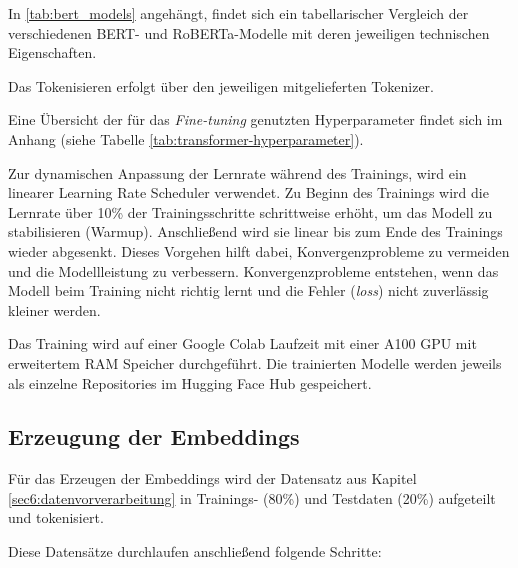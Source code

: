 In \ref{tab:bert_models} angehängt, findet sich ein tabellarischer Vergleich der verschiedenen BERT- und RoBERTa-Modelle mit deren jeweiligen technischen Eigenschaften.

Das Tokenisieren erfolgt über den jeweiligen mitgelieferten Tokenizer.

Eine Übersicht der für das \textit{Fine-tuning} genutzten Hyperparameter findet sich im Anhang (siehe Tabelle \ref{tab:transformer-hyperparameter}).

Zur dynamischen Anpassung der Lernrate während des Trainings, wird ein linearer Learning Rate Scheduler verwendet.
Zu Beginn des Trainings wird die Lernrate über 10\% der Trainingsschritte schrittweise erhöht, um das Modell zu stabilisieren (Warmup). 
Anschließend wird sie linear bis zum Ende des Trainings wieder abgesenkt. Dieses Vorgehen hilft dabei, Konvergenzprobleme zu vermeiden und die Modellleistung zu verbessern.
Konvergenzprobleme entstehen, wenn das Modell beim Training nicht richtig lernt und die Fehler (\textit{loss}) nicht zuverlässig kleiner werden.

Das Training wird auf einer Google Colab Laufzeit mit einer A100 GPU mit erweitertem RAM Speicher durchgeführt.
Die trainierten Modelle werden jeweils als einzelne Repositories im Hugging Face Hub gespeichert.

\subsection{Erzeugung der Embeddings} \label{sec:erzeugung_der_embeddings}

Für das Erzeugen der Embeddings wird der Datensatz aus Kapitel \ref{sec6:datenvorverarbeitung} in Trainings- (80\%) und Testdaten (20\%) aufgeteilt und tokenisiert.

\newpage

Diese Datensätze durchlaufen anschließend folgende Schritte: 

